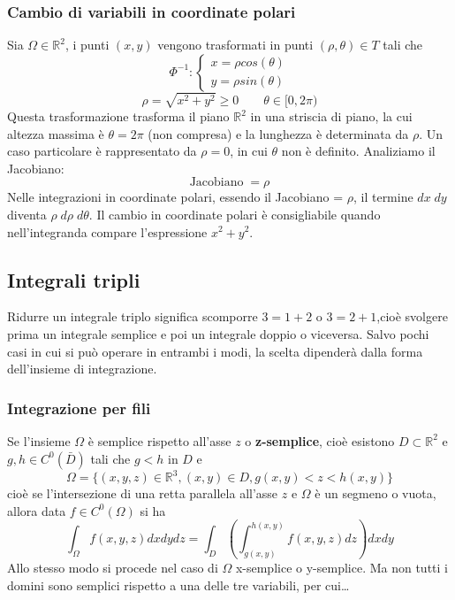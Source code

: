 \subsubsection{Cambio di variabili in coordinate polari}
Sia $\Omega \in \mathbb{R}^2$, i punti $(x,y)$ vengono trasformati in punti $(\rho, \theta) \in T$ tali che
\[
    \Phi^{-1} : \begin{cases}
        x = \rho cos(\theta)\\
        y =\rho sin(\theta)
    \end{cases}
\]
\[
    \rho = \sqrt{x^2 +y^2} \geq 0 \quad \quad \theta \in[0, 2\pi)
\]
Questa trasformazione trasforma il piano $\mathbb{R}^2$ in una striscia di piano, la cui altezza massima è $\theta = 2\pi$ (non compresa) e la lunghezza è determinata da $\rho$.\newline
\newline
Un caso particolare è rappresentato da $\rho = 0$, in cui $\theta$ non è definito.\newline
\newline
Analiziamo il Jacobiano:
\[
    \text{Jacobiano}\;= \rho
\]
Nelle integrazioni in coordinate polari, essendo il Jacobiano = $\rho$, il termine $dx \; dy$ diventa $\rho \; d \rho \; d \theta$.\newline
\newline
Il cambio in coordinate polari è consigliabile quando nell'integranda compare l'espressione $x^2 + y^2$.
\subsection{Integrali tripli}
Ridurre un integrale triplo significa scomporre $3 = 1+2$ o $3=2+1$,cioè svolgere prima un integrale semplice e poi un integrale doppio o viceversa.\newline
Salvo pochi casi in cui si può operare in entrambi i modi, la scelta dipenderà dalla forma dell'insieme di integrazione.
\subsubsection{Integrazione per fili}
Se l'insieme $\Omega$ è semplice rispetto all'asse $z$ o \textbf{z-semplice}, cioè esistono $D \subset \mathbb{R}^2$ e $g,h \in C^0(\bar{D})$ tali che $g<h$ in $D$ e
\[
    \Omega = \{(x,y,z) \in \mathbb{R}^3, (x,y)\in D, g(x,y)<z<h(x,y)\}
\]
cioè se l'intersezione di una retta parallela all'asse $z$ e $\Omega$ è un segmeno o vuota, allora data $f \in C^0(\Omega)$ si ha
\[
    \int_\Omega f(x,y,z) dxdydz = \int_D\left(\int_{g(x,y)}^{h(x,y)}f(x,y,z) dz\right)dxdy
\] 
Allo stesso modo si procede nel caso di $\Omega$ x-semplice o y-semplice.\newline
\newline
Ma non tutti i domini sono semplici rispetto a una delle tre variabili, per cui\dots
